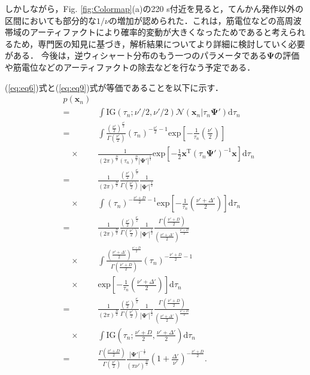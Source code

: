\documentclass[journal]{IEEEtran}
\begin{document}
しかしながら，Fig. \ref{fig:Colormap}(a)の220 s付近を見ると，てんかん発作以外の区間においても部分的な$1/\nu$の増加が認められた．これは，筋電位などの高周波帯域のアーティファクトにより確率的変動が大きくなったためであると考えられるため，専門医の知見に基づき，解析結果についてより詳細に検討していく必要がある．
今後は，逆ウィシャート分布のもう一つのパラメータである$\mathbf{\Psi}$の評価や筋電位などのアーティファクトの除去などを行なう予定である．


(\ref{eq:eq6})式と(\ref{eq:eq9})式が等価であることを以下に示す．
\begin{eqnarray}
	&p(\mathbf{x}_n) \nonumber\\ &=& \int \mathrm{IG}(\tau_n;\nu'/2,\nu'/2) \mathcal{N}(\mathbf{x}_n|\tau_n \mathbf{\Psi}') \mathrm{d}{\tau_n} \nonumber\\
	&=& \int \frac{\left(\frac{\nu'}{2}\right)^{\frac{\nu'}{2}}}{\Gamma \left(\frac{\nu'}{2}\right)} (\tau_n)^{-\frac{\nu'}{2}-1} \mathrm{exp} \left[-\frac{1}{\tau_n} \left(\frac{\nu'}{2} \right) \right] \nonumber\\
	&\quad\times&\frac{1}{(2\pi)^{\frac{D}{2}}(\tau_n)^{\frac{D}{2}}|\mathbf{\Psi'}|^{\frac{1}{2}}} \mathrm{exp} \left[-\frac{1}{2}\mathbf{x}^\mathrm{T} (\tau_n\mathbf{\Psi'})^{-1} \mathbf{x}\right] \mathrm{d}{\tau_n} \nonumber\\
	&=&\frac{1}{(2\pi)^{\frac{D}{2}}}\frac{\left(\frac{\nu'}{2}\right)^{\frac{\nu'}{2}}}{\Gamma \left(\frac{\nu'}{2}\right)}\frac{1}{|\mathbf{\Psi'}|^{\frac{1}{2}}} \nonumber\\
	&\quad\times& \int (\tau_n)^{-\frac{\nu'+D}{2}-1} \mathrm{exp} \left[-\frac{1}{\tau_n} \left(\frac{\nu' + \Delta'}{2}\right) \right] \mathrm{d}{\tau_n} \nonumber\\
	&=&\frac{1}{(2\pi)^{\frac{D}{2}}}\frac{\left(\frac{\nu'}{2}\right)^{\frac{\nu'}{2}}}{\Gamma \left(\frac{\nu'}{2}\right)}\frac{1}{|\mathbf{\Psi'}|^{\frac{1}{2}}} \frac{\Gamma \left(\frac{\nu'+D}{2}\right)}{\left(\frac{\nu'+\Delta'}{2}\right)^{\frac{\nu'+D}{2}}}\nonumber\\
	&\quad\times& \int \frac{\left(\frac{\nu'+\Delta'}{2}\right)^{\frac{\nu'+D}{2}}}{\Gamma \left(\frac{\nu'+D}{2}\right)} (\tau_n)^{-\frac{\nu'+D}{2}-1} \nonumber\\
	&\quad\times& \mathrm{exp} \left[-\frac{1}{\tau_n} \left(\frac{\nu' + \Delta'}{2}\right) \right] \mathrm{d}{\tau_n} \nonumber\\
	&=&\frac{1}{(2\pi)^{\frac{D}{2}}}\frac{\left(\frac{\nu'}{2}\right)^{\frac{\nu'}{2}}}{\Gamma \left(\frac{\nu'}{2}\right)}\frac{1}{|\mathbf{\Psi'}|^{\frac{1}{2}}} \frac{\Gamma \left(\frac{\nu'+D}{2}\right)}{\left(\frac{\nu'+\Delta'}{2}\right)^{\frac{\nu'+D}{2}}}\nonumber\\
	&\quad\times& \int \mathrm{IG}(\tau_n;\frac{\nu'+D}{2},\frac{\nu'+\Delta'}{2}) \mathrm{d}{\tau_n}\nonumber\\
	&=& \frac{\Gamma(\frac{\nu'+D}{2})}{\Gamma(\frac{\nu'}{2})} \frac{|{\bm \Psi'}|^{-\frac{1}{2}}}{\left(\pi \nu' \right)^{\frac{D}{2}}} \left(1+\frac{\Delta '}{\nu '} \right)^{-\frac{\nu'+D}{2}}.
\end{eqnarray}
\end{document}
